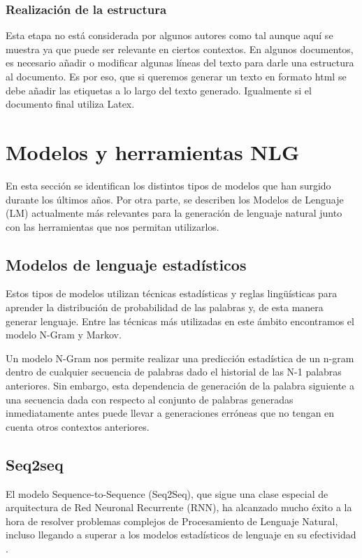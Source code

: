 \subsubsection{Realización de la estructura}
Esta etapa no está considerada por algunos autores como tal aunque aquí se muestra ya que puede ser relevante en ciertos contextos. 
En algunos documentos, es necesario añadir o modificar algunas líneas del texto para darle una estructura al documento. Es por eso, que si queremos generar un texto en formato html se debe añadir las etiquetas a lo largo del texto generado. Igualmente si el documento final utiliza Latex.


\section{Modelos y herramientas NLG}
\label{sec:modelos}
En esta sección se identifican los distintos tipos de modelos que han surgido durante los últimos años. Por otra parte, se describen los Modelos de Lenguaje (LM) actualmente más relevantes para la generación de lenguaje natural junto con las herramientas que nos permitan utilizarlos.


\subsection{Modelos de lenguaje estadísticos}
Estos tipos de modelos utilizan técnicas estadísticas y reglas lingüísticas para aprender la distribución de probabilidad de las palabras y, de esta manera generar lenguaje. Entre las técnicas más utilizadas en este ámbito encontramos el modelo N-Gram y Markov.

Un modelo N-Gram nos permite realizar una predicción estadística de un n-gram dentro de cualquier secuencia de palabras dado el historial de las N-1 palabras anteriores. Sin embargo, esta dependencia de generación de la palabra siguiente a una secuencia dada con respecto al conjunto de palabras generadas inmediatamente antes puede llevar a generaciones erróneas que no tengan en cuenta otros contextos anteriores.

\subsection{Seq2seq}
El modelo Sequence-to-Sequence (Seq2Seq), que sigue una clase especial de arquitectura de Red Neuronal Recurrente (RNN), ha alcanzado mucho éxito a la hora de resolver problemas complejos de Procesamiento de Lenguaje Natural, incluso llegando a superar a los modelos estadísticos de lenguaje en su efectividad \citep{analytics_vidhya_2020}.

